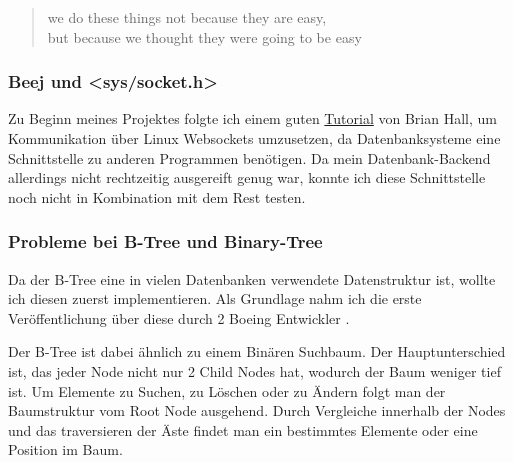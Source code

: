\documentclass[11pt,a4paper]{article}
\begin{document}
\begin{quote}
    \guillemetright we do these things not because they are easy, \\
    but because we thought they were going to be easy \guillemetleft
\end{quote}

\subsubsection{Beej und <sys/socket.h>}
Zu Beginn meines Projektes folgte ich einem guten \href{https://beej.us/guide/bgnet/html/}{Tutorial}
von Brian Hall, um Kommunikation über Linux Websockets umzusetzen, da Datenbanksysteme
eine Schnittstelle zu anderen Programmen benötigen.
Da mein Datenbank-Backend allerdings nicht rechtzeitig ausgereift genug war, konnte
ich diese Schnittstelle noch nicht in Kombination mit dem Rest testen.

\subsubsection{Probleme bei B-Tree und Binary-Tree}

Da der B-Tree eine in vielen Datenbanken verwendete Datenstruktur ist, wollte ich
diesen zuerst implementieren. Als Grundlage nahm ich die erste Veröffentlichung über
diese durch 2 Boeing Entwickler \cite{boeing_engineers}.

\vspace*{0.3cm}

Der B-Tree ist dabei ähnlich zu einem Binären Suchbaum.
Der Hauptunterschied ist, das jeder Node nicht nur 2 Child Nodes
hat, wodurch der Baum weniger tief ist.
Um Elemente zu Suchen, zu Löschen oder zu Ändern folgt man der Baumstruktur vom
Root Node ausgehend. Durch Vergleiche innerhalb der Nodes und das traversieren der
Äste findet man ein bestimmtes Elemente oder eine Position im Baum.

\begin{center}
\end{center}
\end{document}
